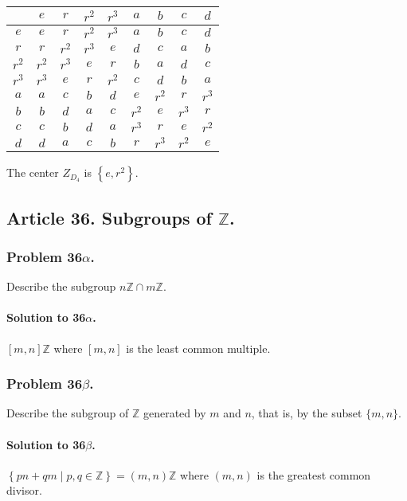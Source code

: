 \begin{center}
\begin{tabular}{c||c|c|c|c||c|c|c|c|}
      & $e$ & $r$ & $r^2$ & $r^3$ & $a$ & $b$ & $c$ & $d$ \\
\hline \hline
$e$   & $e$ & $r$ & $r^2$ & $r^3$ & $a$ & $b$ & $c$ & $d$ \\
\hline
$r$   & $r$ & $r^2$ & $r^3$ & $e$ & $d$ & $c$ & $a$ & $b$ \\
\hline
$r^2$ & $r^2$ & $r^3$ & $e$ & $r$ & $b$ & $a$ & $d$ & $c$ \\
\hline
$r^3$ & $r^3$ & $e$ & $r$ & $r^2$ & $c$ & $d$ & $b$ & $a$ \\
\hline \hline
$a$   & $a$ & $c$ & $b$ & $d$ & $e$ & $r^2$ & $r$ & $r^3$ \\
\hline
$b$   & $b$ & $d$ & $a$ & $c$ & $r^2$ & $e$ & $r^3$ & $r$ \\
\hline
$c$   & $c$ & $b$ & $d$ & $a$ & $r^3$ & $r$ & $e$ & $r^2$ \\
\hline
$d$   & $d$ & $a$ & $c$ & $b$ & $r$ & $r^3$ & $r^2$ & $e$ \\
\hline
\end{tabular}
\end{center}

The center $Z_{D_4}$ is $\left\{e, r^2\right\}$.

\subsection{Article 36. Subgroups of $\mathbb{Z}$.}
\subsubsection{Problem 36$\alpha$.}
Describe the subgroup $n\mathbb{Z} \cap m\mathbb{Z}$.

\paragraph*{Solution to 36$\alpha$.}
$[m,n]\mathbb{Z}$ where $[m,n]$ is the least common multiple.

\subsubsection{Problem 36$\beta$.}
Describe the subgroup of $\mathbb{Z}$ generated by $m$ and $n$, that is,
by the subset $\{ m, n\}$.

\paragraph*{Solution to 36$\beta$.}
$\left\{ pn + qm \mid p,q \in \mathbb{Z} \right\} = (m,n)\mathbb{Z}$ where
$(m,n)$ is the greatest common divisor.

